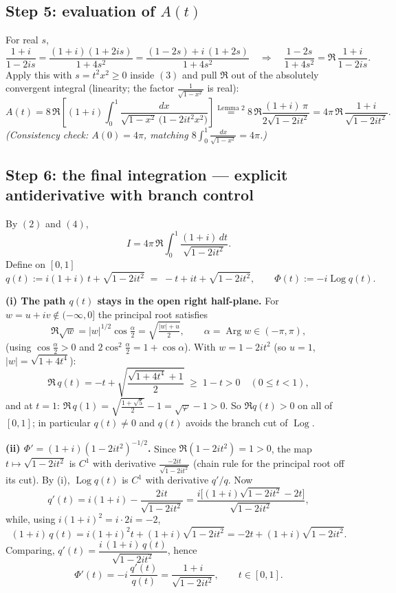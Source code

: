 \documentclass[11pt]{article}
\theoremstyle{remark}
\begin{document}
\subsection*{Step 5: evaluation of $A(t)$}

For real $s$,
$$\frac{1+i}{1-2is}=\frac{(1+i)(1+2is)}{1+4s^2}=\frac{(1-2s)+i\,(1+2s)}{1+4s^2}
\quad\Longrightarrow\quad
\frac{1-2s}{1+4s^2}=\Re\,\frac{1+i}{1-2is}.$$
Apply this with $s=t^2x^2\ge0$ inside $(3)$ and pull $\Re$ out of the absolutely convergent integral (linearity; the factor $\frac1{\sqrt{1-x^2}}$ is real):
\begin{equation}A(t)=8\,\Re\left[(1+i)\int_0^1\frac{dx}{\sqrt{1-x^2}\,\big(1-2it^2x^2\big)}\right]
\overset{\text{Lemma 2}}{=}8\,\Re\frac{(1+i)\,\pi}{2\sqrt{1-2it^2}}
=4\pi\,\Re\,\frac{1+i}{\sqrt{1-2it^2}}. \tag{4}\end{equation}
\textit{(Consistency check: $A(0)=4\pi$, matching $8\int_0^1\frac{dx}{\sqrt{1-x^2}}=4\pi$.)}

\subsection*{Step 6: the final integration --- explicit antiderivative with branch control}

By $(2)$ and $(4)$,
\begin{equation}I=4\pi\,\Re\int_0^1\frac{(1+i)\,dt}{\sqrt{1-2it^2}}. \tag{5}\end{equation}
Define on $[0,1]$
$$q(t):=i(1+i)\,t+\sqrt{1-2it^2}\;=\;-t+it+\sqrt{1-2it^2},
\qquad \Phi(t):=-i\operatorname{Log} q(t).$$

\textbf{(i) The path $q(t)$ stays in the open right half-plane.} For $w=u+iv\notin(-\infty,0]$ the principal root satisfies
$$\Re\sqrt w=|w|^{1/2}\cos\tfrac{\alpha}2=\sqrt{\tfrac{|w|+u}{2}},\qquad \alpha=\operatorname{Arg}w\in(-\pi,\pi),$$
(using $\cos\frac\alpha2>0$ and $2\cos^2\frac\alpha2=1+\cos\alpha$). With $w=1-2it^2$ (so $u=1$, $|w|=\sqrt{1+4t^4}$):
$$\Re\,q(t)=-t+\sqrt{\frac{\sqrt{1+4t^4}+1}{2}}\;\ge\;1-t>0\quad(0\le t<1),$$
and at $t=1$: $\Re\,q(1)=\sqrt{\frac{1+\sqrt5}{2}}-1=\sqrt\varphi-1>0$. So $\Re q(t)>0$ on all of $[0,1]$; in particular $q(t)\neq0$ and $q(t)$ avoids the branch cut of $\operatorname{Log}$.

\textbf{(ii) $\Phi'=(1+i)(1-2it^2)^{-1/2}$.} Since $\Re(1-2it^2)=1>0$, the map $t\mapsto\sqrt{1-2it^2}$ is $C^1$ with derivative $\frac{-2it}{\sqrt{1-2it^2}}$ (chain rule for the principal root off its cut). By (i), $\operatorname{Log}q(t)$ is $C^1$ with derivative $q'/q$. Now
$$q'(t)=i(1+i)-\frac{2it}{\sqrt{1-2it^2}}
=\frac{i\big[(1+i)\sqrt{1-2it^2}-2t\big]}{\sqrt{1-2it^2}},$$
while, using $i(1+i)^2=i\cdot 2i=-2$,
$$(1+i)\,q(t)=i(1+i)^2t+(1+i)\sqrt{1-2it^2}=-2t+(1+i)\sqrt{1-2it^2}.$$
Comparing, $q'(t)=\dfrac{i\,(1+i)\,q(t)}{\sqrt{1-2it^2}}$, hence
$$\Phi'(t)=-i\,\frac{q'(t)}{q(t)}=\frac{1+i}{\sqrt{1-2it^2}},\qquad t\in[0,1].$$
\end{document}
